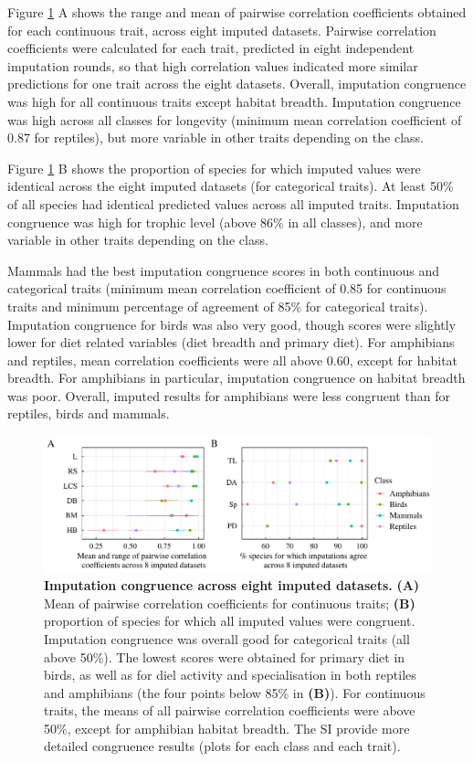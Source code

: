 Figure \ref{congruence} A shows the range and mean of pairwise correlation coefficients obtained for each continuous trait, across eight imputed datasets. Pairwise correlation coefficients were calculated for each trait, predicted in eight independent imputation rounds, so that high correlation  values indicated more similar predictions for one trait across the eight datasets. Overall, imputation congruence was high for all continuous traits except habitat breadth. Imputation congruence was high across all classes for longevity (minimum mean correlation coefficient of 0.87 for reptiles), but more variable in other traits depending on the class.

Figure \ref{congruence} B shows the proportion of species for which imputed values were identical across the eight imputed datasets (for categorical traits). At least 50\% of all species had identical predicted values across all imputed traits. Imputation congruence was high for trophic level (above 86\% in all classes), and more variable in other traits depending on the class. 

Mammals had the best imputation congruence scores in both continuous and categorical traits (minimum mean correlation coefficient of 0.85 for continuous traits and minimum percentage of agreement of 85\% for categorical traits). Imputation congruence for birds was also very good, though scores were slightly lower for diet related variables (diet breadth and primary diet). For amphibians and reptiles, mean correlation coefficients were all above 0.60, except for habitat breadth. For amphibians in particular, imputation congruence on habitat breadth was poor. Overall, imputed results for amphibians were less congruent than for reptiles, birds and mammals.

\begin{figure}[h!]
\centering
\includegraphics[scale=0.75]{figures/chapter2/Congruence_imputations/Summary}
\caption[Imputation congruence across eight imputed datasets]{\textbf{Imputation congruence across eight imputed datasets.} \textbf{(A)} Mean of pairwise correlation coefficients for continuous traits; \textbf{(B)} proportion of species for which all imputed values were congruent. Imputation congruence was overall good for categorical traits (all above 50\%). The lowest scores were obtained for primary diet in birds, as well as for diel activity and specialisation in both reptiles and amphibians (the four points below 85\% in \textbf{(B)}). For continuous traits, the means of all pairwise correlation coefficients were above 50\%, except for amphibian habitat breadth. The SI provide more detailed congruence results (plots for each class and each trait).}
\label{congruence}
\end{figure}

